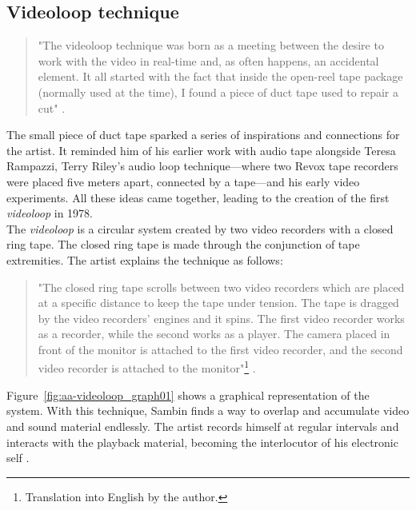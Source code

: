 \subsection*{Videoloop technique}
\begin{quote}
    "The videoloop technique was born as a meeting between the desire to work with the video in real-time and, as often happens, an accidental element. It all started with the fact that inside the open-reel tape package (normally used at the time), I found a piece of duct tape used to repair a cut" \cite{fiordelmondo2023toward}.
\end{quote}
The small piece of duct tape sparked a series of inspirations and connections for the artist. It reminded him of his earlier work with audio tape alongside Teresa Rampazzi, Terry Riley's audio loop technique—where two Revox tape recorders were placed five meters apart, connected by a tape—and his early video experiments. All these ideas came together, leading to the creation of the first \textit{videoloop} in 1978.\\
The \textit{videoloop} is a circular system created by two video recorders with a closed ring tape. The closed ring tape is made through the conjunction of tape extremities. The artist explains the technique as follows: 
\begin{quote}
    "The closed ring tape scrolls between two video recorders which are placed at a specific distance to keep the tape under tension. The tape is dragged by the video recorders’ engines and it spins. The first video recorder works as a recorder, while the second works as a player. The camera placed in front of the monitor is attached to the first video recorder, and the second video recorder is attached to the monitor"\footnote{Translation into English by the author.} \cite{lischi2014michele}. 
\end{quote}
Figure~\ref{fig:aa-videoloop_graph01} shows a graphical representation of the system. With this technique, Sambin finds a way to overlap and accumulate video and sound material endlessly. The artist records himself at regular intervals and interacts with the playback material, becoming the interlocutor of his electronic self \cite{balzola2019arti}.
